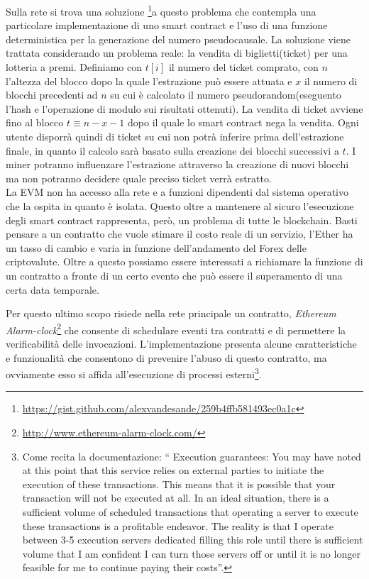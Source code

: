 Sulla rete si trova una soluzione \footnote{\url{https://gist.github.com/alexvandesande/259b4ffb581493ec0a1c}}a questo problema che contempla una particolare implementazione di uno smart contract e l'uso di una funzione deterministica per la generazione del numero pseudocausale. La soluzione viene trattata considerando un problema reale: la vendita di biglietti(ticket) per una lotteria a premi. Definiamo con $t[i]$ il numero del ticket comprato, con $n$ l'altezza del blocco dopo la quale l'estrazione può essere attuata e $x$ il numero di blocchi precedenti ad $n$ su cui è calcolato il numero pseudorandom(eseguento l'hash e l'operazione di modulo sui risultati ottenuti). La vendita di ticket avviene fino al blocco $t\equiv n - x - 1$ dopo il quale lo smart contract nega la vendita. Ogni utente disporrà quindi di ticket su cui non potrà inferire prima dell'estrazione finale, in quanto il calcolo sarà basato sulla creazione dei blocchi successivi a $t$. I miner potranno influenzare l'estrazione attraverso la creazione di nuovi blocchi ma non potranno decidere quale preciso ticket verrà estratto.\\

La EVM non ha accesso alla rete e a funzioni dipendenti dal sistema operativo che la ospita in quanto è isolata. Questo oltre a mantenere al sicuro l'esecuzione degli smart contract rappresenta, però, un problema di tutte le blockchain. Basti pensare a un contratto che vuole stimare il costo reale di un servizio, l'Ether ha un tasso di cambio e varia in funzione dell'andamento del Forex delle criptovalute. 
Oltre a questo possiamo essere interessati a richiamare la funzione di un contratto a fronte di un certo evento che può essere il superamento di una certa data temporale. 

Per questo ultimo scopo risiede nella rete principale un contratto, \textit{Ethereum Alarm-clock}\footnote{\url{http://www.ethereum-alarm-clock.com/}} che consente di schedulare eventi tra contratti e di permettere la verificabilità delle invocazioni. L'implementazione presenta alcune caratteristiche e funzionalità che consentono di prevenire l'abuso di questo contratto, ma ovviamente esso si affida all'esecuzione di processi esterni\footnote{Come recita la documentazione: `` Execution guarantees: You may have noted at this point that this service relies on external parties to initiate the execution of these transactions. This means that it is possible that your transaction will not be executed at all. In an ideal situation, there is a sufficient volume of scheduled transactions that operating a server to execute these transactions is a profitable endeavor. The reality is that I operate between 3-5 execution servers dedicated filling this role until there is sufficient volume that I am confident I can turn those servers off or until it is no longer feasible for me to continue paying their costs''.}.


